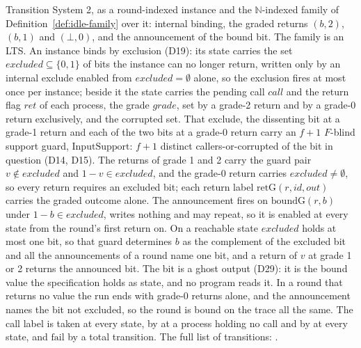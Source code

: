 \begin{definition}
  \label{def:aba-gbca-spec}
  \leanok
  Transition System 2, as a round-indexed instance and the $\mathbb{N}$-indexed family of Definition~\ref{def:idle-family} over it: internal binding, the graded returns $(b,2)$, $(b,1)$ and $(\bot,0)$, and the announcement of the bound bit. The family is an LTS.\leanok{} An instance binds by exclusion (D19): its state carries the set $excluded \subseteq \{0,1\}$ of bits the instance can no longer return, written only by an internal exclude enabled from $excluded = \emptyset$ alone, so the exclusion fires at most once per instance; beside it the state carries the pending call $call$ and the return flag $ret$ of each process, the grade $grade$, set by a grade-2 return and by a grade-0 return exclusively, and the corrupted set.
  That exclude, the dissenting bit at a grade-1 return and each of the two bits at a grade-0 return carry an $f{+}1$ $F$-blind support guard, $\mathrm{InputSupport}$: $f{+}1$ distinct callers-or-corrupted of the bit in question (D14, D15).
  The returns of grade 1 and 2 carry the guard pair $v \notin excluded$ and $1-v \in excluded$, and the grade-0 return carries $excluded \neq \emptyset$, so every return requires an excluded bit; each return label $\mathrm{retG}(r,id,out)$ carries the graded outcome alone.
  The announcement  fires on $\mathrm{boundG}(r,b)$ under $1-b \in excluded$, writes nothing and may repeat, so it is enabled at every state from the round's first return on.
  On a reachable state $excluded$ holds at most one bit, so that guard determines $b$ as the complement of the excluded bit and all the announcements of a round name one bit, and a return of $v$ at grade 1 or 2 returns the announced bit.
  The bit is a ghost output (D29): it is the bound value the specification holds as state, and no program reads it.
  In a round that returns no value the run ends with grade-0 returns alone, and the announcement names the bit not excluded, so the round is bound on the trace all the same.
  The call label is taken at every state, by  at a process holding no call and by  at every state, and $\mathrm{fail}$ by a total transition.
  The full list of transitions: .
\end{definition}
